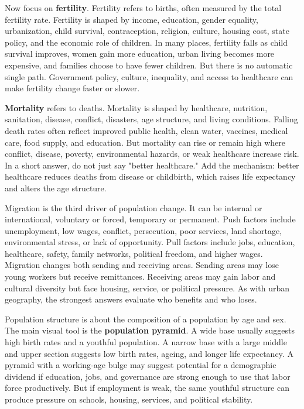 \documentclass[11pt,a4paper]{article}
\newcommand{\term}[1]{\textcolor{HeadingBlue}{\textbf{#1}}}
\begin{document}
Now focus on \term{fertility}. Fertility refers to births, often measured by the
total fertility rate. Fertility is shaped by income, education, gender equality,
urbanization, child survival, contraception, religion, culture, housing cost,
state policy, and the economic role of children. In many places, fertility falls
as child survival improves, women gain more education, urban living becomes more
expensive, and families choose to have fewer children. But there is no automatic
single path. Government policy, culture, inequality, and access to healthcare can
make fertility change faster or slower.

\term{Mortality} refers to deaths. Mortality is shaped by healthcare, nutrition,
sanitation, disease, conflict, disasters, age structure, and living conditions.
Falling death rates often reflect improved public health, clean water, vaccines,
medical care, food supply, and education. But mortality can rise or remain high
where conflict, disease, poverty, environmental hazards, or weak healthcare
increase risk. In a short answer, do not just say "better healthcare." Add the
mechanism: better healthcare reduces deaths from disease or childbirth, which
raises life expectancy and alters the age structure.

Migration is the third driver of population change. It can be internal or
international, voluntary or forced, temporary or permanent. Push factors include
unemployment, low wages, conflict, persecution, poor services, land shortage,
environmental stress, or lack of opportunity. Pull factors include jobs,
education, healthcare, safety, family networks, political freedom, and higher
wages. Migration changes both sending and receiving areas. Sending areas may
lose young workers but receive remittances. Receiving areas may gain labor and
cultural diversity but face housing, service, or political pressure. As with
urban geography, the strongest answers evaluate who benefits and who loses.

Population structure is about the composition of a population by age and sex.
The main visual tool is the \term{population pyramid}. A wide base usually
suggests high birth rates and a youthful population. A narrow base with a large
middle and upper section suggests low birth rates, ageing, and longer life
expectancy. A pyramid with a working-age bulge may suggest potential for a
demographic dividend if education, jobs, and governance are strong enough to use
that labor force productively. But if employment is weak, the same youthful
structure can produce pressure on schools, housing, services, and political
stability.
\end{document}
